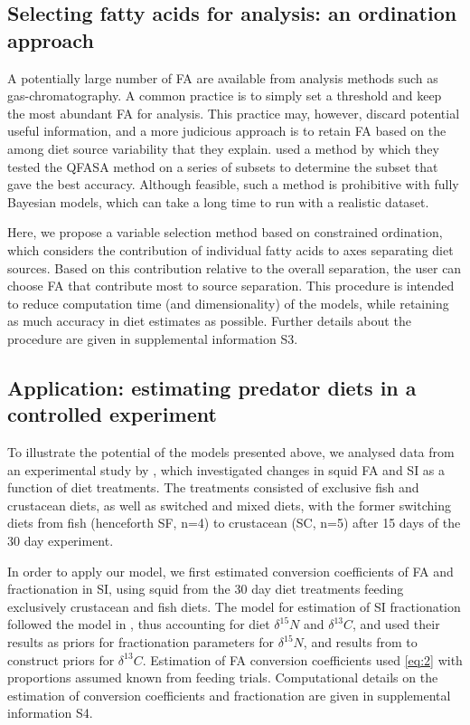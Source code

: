 \documentclass{article}%
\begin{document}
\begin{spacing}{1.9}
\begin{flushleft}
\subsection{Selecting fatty acids for analysis: an ordination approach}

A potentially large number of FA are available from analysis methods
such as gas-chromatography. A common practice is to simply set a
threshold and keep the most abundant FA for analysis. This practice
may, however, discard potential useful information, and a more
judicious approach is to retain FA based on the among diet source
variability that they explain. \citet{wang_validating_2010} used a
method by which they tested the QFASA method on a series of subsets to
determine the subset that gave the best accuracy. Although feasible, such
a method is prohibitive with fully Bayesian models, which can take a long
time to run with a realistic dataset.

Here, we propose a variable selection method based on constrained
ordination, which considers the contribution of individual fatty
acids to axes separating diet sources. Based on this contribution
relative to the overall separation, the user can choose FA
that contribute most to source separation. This procedure is intended
to reduce computation time (and dimensionality) of the models,
while retaining as much accuracy in diet estimates as possible. Further details about the
procedure are given in supplemental information S3.


\subsection{Application: estimating predator diets in a controlled
  experiment}

To illustrate the potential of the models presented above, we analysed
data from an experimental study by
\citet{stowasser_experimental_2006}, which investigated changes in
squid FA and SI as a function of diet treatments. The treatments consisted of
exclusive fish and crustacean diets, as well as switched and mixed
diets, with the former switching diets from fish (henceforth SF, n=4) to
crustacean (SC, n=5) after 15 days of the 30 day experiment. 

In order to apply our model, we first estimated conversion
coefficients of FA and fractionation in SI, using squid from the 30
day diet treatments feeding exclusively crustacean and fish diets. The
model for estimation of SI fractionation followed the model in
\citet{hussey_rescaling_2014}, thus accounting for diet $\delta^{15}N$
and $\delta^{13}C$, and used their results as priors for fractionation
parameters for $\delta^{15}N$, and results from \citet{caut_variation_2009} to
construct priors for $\delta^{13}C$. Estimation of FA conversion coefficients used
 \eqref{eq:2} with proportions assumed known from feeding
 trials. Computational details on the estimation of conversion coefficients and
 fractionation are given in supplemental information S4.


\end{flushleft}
\end{spacing}
\end{document}
